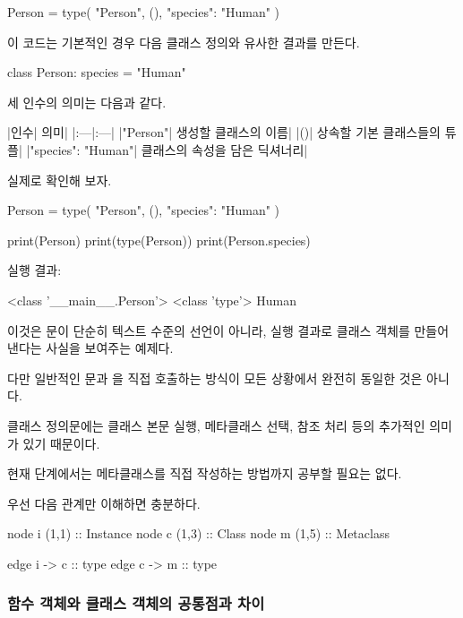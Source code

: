 \begin{dhkcode}
Person = type(
    "Person",
    (),
    {"species": "Human"}
)
\end{dhkcode}

이 코드는 기본적인 경우 다음 클래스 정의와 유사한 결과를 만든다.

\begin{dhkcode}
class Person:
    species = "Human"
\end{dhkcode}

세 인수의 의미는 다음과 같다.

\begin{dhktable}
|인수|	의미|
|:---|:---|
|"Person"|	생성할 클래스의 이름|
|()|	상속할 기본 클래스들의 튜플|
|{"species": "Human"}|	클래스의 속성을 담은 딕셔너리|
\end{dhktable}

실제로 확인해 보자.

\begin{dhkcode}
Person = type(
    "Person",
    (),
    {"species": "Human"}
)

print(Person)
print(type(Person))
print(Person.species)
\end{dhkcode}

실행 결과:

\begin{dhkzsh}
<class '__main__.Person'>
<class 'type'>
Human
\end{dhkzsh}

이것은 문이 단순히 텍스트 수준의 선언이 아니라, 실행 결과로 클래스 객체를 만들어 낸다는 사실을 보여주는 예제다.

다만 일반적인 문과 을 직접 호출하는 방식이 모든 상황에서 완전히 동일한 것은 아니다.

클래스 정의문에는 클래스 본문 실행, 메타클래스 선택,  참조 처리 등의 추가적인 의미가 있기 때문이다.

현재 단계에서는 메타클래스를 직접 작성하는 방법까지 공부할 필요는 없다.

우선 다음 관계만 이해하면 충분하다.

\begin{dhkdiagram}[in=6]
node i (1,1) :: Instance
node c (1,3) :: Class
node m (1,5) :: Metaclass

edge i -> c :: type
edge c -> m :: type
\end{dhkdiagram}

\subsubsection{함수 객체와 클래스 객체의 공통점과 차이}

